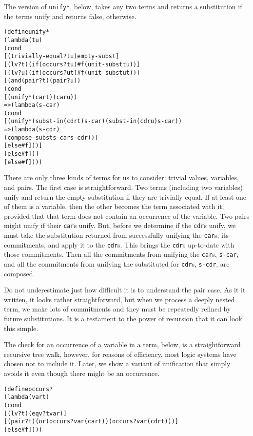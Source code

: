The version of \texttt{unify*}, below, takes any two terms and returns a
substitution if the terms unify and returns false, otherwise.

\begin{alltt}
(define unify*
  (lambda (t u)
    (cond
      [(trivially-equal? t u) empty-subst]
      [(lv? t) (if (occurs? t u) #f (unit-subst t u))]
      [(lv? u) (if (occurs? u t) #f (unit-subst u t))]
      [(and (pair? t) (pair? u))
       (cond
         [(unify* (car t) (car u))
           => (lambda (s-car)
                (cond
                  [(unify* (subst-in (cdr t) s-car) (subst-in (cdr u) s-car))
                   => (lambda (s-cdr)
                        (compose-subst s-car s-cdr))]
                  [else #f]))]
         [else #f])]
      [else #f])))
\end{alltt}
There are only three kinds of terms for us to consider: trivial
values, variables, and pairs.  The first case is straightforward.  Two
terms (including two variables) unify and return the empty
substitution if they are trivially equal.  If at least one of them is
a variable, then the other becomes the term associated with it,
provided that that term does not contain an occurrence of the
variable.  Two pairs might unify if their \texttt{car}s unify.  But,
before we determine if the \texttt{cdr}s unify, we must take the
substitution returned from successfully unifying the \texttt{car}s,
its commitments, and apply it to the \texttt{cdr}s.  This brings the
\texttt{cdr}s up-to-date with those commitments.  Then all the
commitments from unifying the \texttt{car}s, \texttt{s-car}, and all
the commitments from unifying the substituted for \texttt{cdr}s,
\texttt{s-cdr}, are composed.

Do not underestimate just how difficult it is to understand the pair
case.  As it it written, it looks rather straightforward, but when we
process a deeply nested term, we make lots of commitments and they
must be repeatedly refined by future substitutions.  It is a testament
to the power of recursion that it can look this simple.

The check for an occurrence of a variable in a term, below, is a
straightforward recursive tree walk, however, for reasons of efficiency,
most logic systems have chosen not to include it.  Later, we show a
variant of unification that simply avoids it even though there might
be an occurrence.

\begin{alltt}
(define occurs?
  (lambda (var t)
    (cond
      [(lv? t) (eqv? t var)]
      [(pair? t) (or (occurs? var (car t)) (occurs? var (cdr t)))]
      [else #f])))
\end{alltt}

